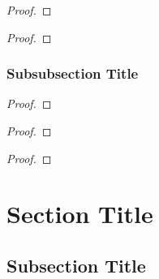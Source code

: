 \begin{proof}
    \lipsum[1]
\end{proof}

\begin{coro}
    \lipsum[1]
\end{coro}

\begin{proof}
    \lipsum[1]
\end{proof}

\subsubsection{Subsubsection Title}

\begin{lemm}
    \lipsum[1]
\end{lemm}

\begin{proof}
    \lipsum[1]
\end{proof}

\begin{thrm}
    \lipsum[1]
\end{thrm}

\begin{proof}
    \lipsum[1]
\end{proof}

\begin{coro}
    \lipsum[1]
\end{coro}

\begin{proof}
    \lipsum[1]
\end{proof}

\section{Section Title}

\lipsum[1]

\begin{defn}
    \lipsum[1]
\end{defn}

\begin{exmp}
    \lipsum[1]
\end{exmp}

\begin{rmrk}
    \lipsum[1]
\end{rmrk}

\subsection{Subsection Title}

